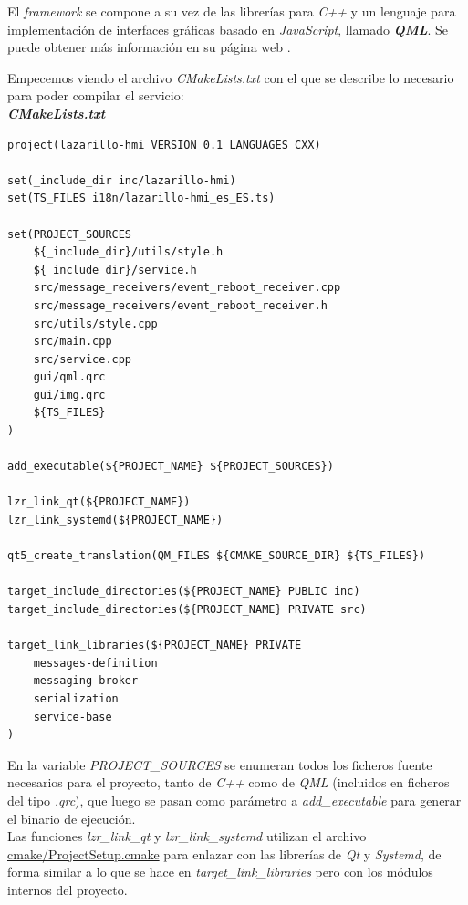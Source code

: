 El \textit{framework} se compone a su vez de las librerías para \emph{C++} y un lenguaje para implementación de interfaces gráficas basado en \textit{JavaScript}, llamado \textbf{\textit{QML}}. Se puede obtener más información en su página web \cite{qt-qml}.

Empecemos viendo el archivo \emph{CMakeLists.txt} con el que se describe lo necesario para poder compilar el servicio:\\

\textbf{\textit{\href{https://github.com/adrianmorente/lazarillo-embedded/blob/master/lazarillo-hmi/CMakeLists.txt}{CMakeLists.txt}}}
\begin{lstlisting}
project(lazarillo-hmi VERSION 0.1 LANGUAGES CXX)

set(_include_dir inc/lazarillo-hmi)
set(TS_FILES i18n/lazarillo-hmi_es_ES.ts)

set(PROJECT_SOURCES
	${_include_dir}/utils/style.h
	${_include_dir}/service.h
	src/message_receivers/event_reboot_receiver.cpp
	src/message_receivers/event_reboot_receiver.h  
	src/utils/style.cpp
	src/main.cpp
	src/service.cpp
	gui/qml.qrc
	gui/img.qrc
	${TS_FILES}
)

add_executable(${PROJECT_NAME} ${PROJECT_SOURCES})

lzr_link_qt(${PROJECT_NAME})
lzr_link_systemd(${PROJECT_NAME})

qt5_create_translation(QM_FILES ${CMAKE_SOURCE_DIR} ${TS_FILES})

target_include_directories(${PROJECT_NAME} PUBLIC inc)
target_include_directories(${PROJECT_NAME} PRIVATE src)

target_link_libraries(${PROJECT_NAME} PRIVATE
	messages-definition
	messaging-broker
	serialization
	service-base
)
\end{lstlisting}

En la variable \emph{PROJECT\_SOURCES} se enumeran todos los ficheros fuente necesarios para el proyecto, tanto de \textit{C++} como de \textit{QML} (incluidos en ficheros del tipo \emph{.qrc}), que luego se pasan como parámetro a \emph{add\_executable} para generar el binario de ejecución.\\

Las funciones \emph{lzr\_link\_qt} y \emph{lzr\_link\_systemd} utilizan el archivo \href{https://github.com/adrianmorente/lazarillo-embedded/blob/master/cmake/ProjectSetup.cmake}{cmake/ProjectSetup.cmake} para enlazar con las librerías de \textit{Qt} y \textit{Systemd}, de forma similar a lo que se hace en \emph{target\_link\_libraries} pero con los módulos internos del proyecto.\\

